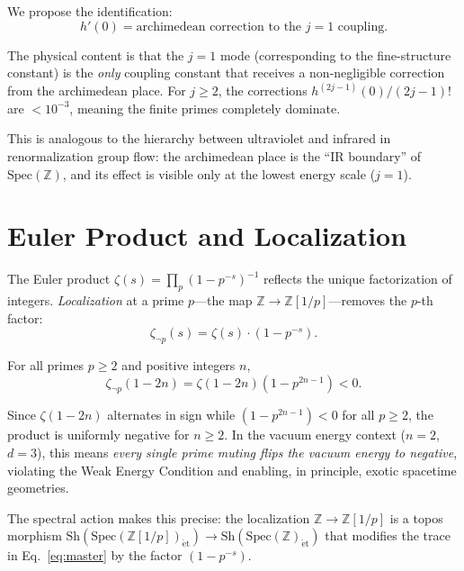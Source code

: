 \documentclass[aps,prl,twocolumn,superscriptaddress,nofootinbib]{revtex4-2}
\newcommand{\Spec}{\mathrm{Spec}}
\newcommand{\Sh}{\mathrm{Sh}}
\begin{document}
We propose the identification:
\begin{equation}
  h'(0) = \text{archimedean correction to the }j{=}1\text{ coupling}.
\end{equation}

The physical content is that the $j=1$ mode (corresponding to the
fine-structure constant) is the \emph{only} coupling constant that
receives a non-negligible correction from the archimedean place.
For $j\geq 2$, the corrections $h^{(2j-1)}(0)/(2j{-}1)!$ are
$<10^{-3}$, meaning the finite primes completely dominate.

This is analogous to the hierarchy between ultraviolet and infrared
in renormalization group flow: the archimedean place is the ``IR
boundary'' of $\Spec(\mathbb{Z})$, and its effect is visible only
at the lowest energy scale ($j=1$).

\section{Euler Product and Localization}

The Euler product $\zeta(s)=\prod_p(1-p^{-s})^{-1}$ reflects the
unique factorization of integers.  \emph{Localization} at a prime
$p$---the map $\mathbb{Z}\to\mathbb{Z}[1/p]$---removes the $p$-th
factor:
\begin{equation}
  \zeta_{\neg p}(s)=\zeta(s)\cdot(1-p^{-s}).
\end{equation}

\begin{theorem}
For all primes $p\geq 2$ and positive integers $n$,
\begin{equation}
  \zeta_{\neg p}(1{-}2n)=\zeta(1{-}2n)(1-p^{2n-1})<0.
\end{equation}
\end{theorem}

\noindent Since $\zeta(1{-}2n)$ alternates in sign while
$(1-p^{2n-1})<0$ for all $p\geq 2$, the product is uniformly
negative for $n\geq 2$.  In the vacuum energy context ($n=2$,
$d=3$), this means \emph{every single prime muting flips the vacuum
energy to negative}, violating the Weak Energy Condition and
enabling, in principle, exotic spacetime geometries.

The spectral action makes this precise: the localization
$\mathbb{Z}\to\mathbb{Z}[1/p]$ is a topos morphism
$\Sh(\Spec(\mathbb{Z}[1/p])_{\mathrm{\acute{e}t}})
\to\Sh(\Spec(\mathbb{Z})_{\mathrm{\acute{e}t}})$
that modifies the trace in Eq.~\eqref{eq:master} by the factor
$(1-p^{-s})$.
\end{document}
